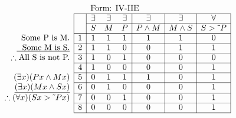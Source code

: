 \documentclass[10pt,legalpaper,landscape,cmtt]{article}
\begin{document}
{\begin{minipage}[t]{3.25in}
	\(
	\begin{array}{r|c|ccc|c|c|c|}
		\multicolumn{2}{c}{}&\multicolumn{6}{l}{\mbox{Form: IV-IIE}} \\ \cline{2-8}
		\hspace{1in}	&	& \exists & \exists & \exists & \exists & \exists & \forall\\ \cline{3-8}
		&	& S & M & P &  P \wedge M  &  M \wedge S  &  S > \tilde~P \\ \cline{2-8} \cline{2-8}
		\phantom{\therefore}\mbox{Some P is M.}   & 1 & 1 & 1 & 1 &   1   &   1   &   0  \\ \cline{2-8}
		\underline{\phantom{\therefore}\mbox{Some M is S.}}   & 2 & 1 & 1 & 0 &   0   &   1   &   1  \\ \cline{2-8}
		\therefore \mbox{All S is not P.}   & 3 & 1 & 0 & 1 &   0   &   0   &   0  \\ \cline{2-8}
		& 4 & 1 & 0 & 0 &   0   &   0   &   1  \\ \cline{2-8}
		(\exists x)(Px \wedge Mx)   & 5 & 0 & 1 & 1 &   1   &   0   &   1  \\ \cline{2-8}
		\underline{(\exists x)(Mx \wedge Sx)}   & 6 & 0 & 1 & 0 &   0   &   0   &   1  \\ \cline{2-8}
		\therefore(\forall x)(Sx > \tilde~Px)   & 7 & 0 & 0 & 1 &   0   &   0   &   1  \\ \cline{2-8}
		& 8 & 0 & 0 & 0 &   0   &   0   &   1   \\ \cline{2-8}\cline{2-8} 
	\end{array}
	\)
\end{minipage}

}
\end{document}

